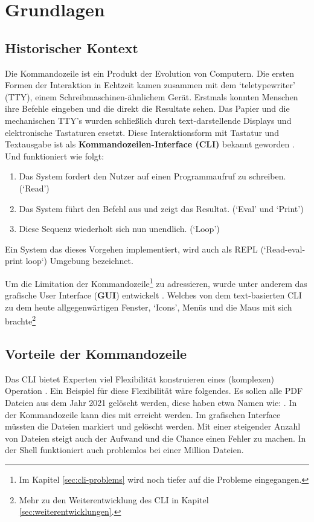 \documentclass[oneside,bibliography=totocnumbered,BCOR=5mm]{scrbook}
\begin{document}
\chapter{Grundlagen}
\label{sec:grundlagen}

\section{Historischer Kontext}
\label{sec:historic-context}

Die Kommandozeile ist ein Produkt der Evolution von Computern. Die ersten
Formen der Interaktion in Echtzeit kamen zusammen mit dem `teletypewriter'
(TTY), einem Schreibmaschinen-ähnlichem Gerät. Erstmals konnten Menschen
ihre Befehle eingeben und die direkt die Resultate sehen. Das Papier und die
mechanischen TTY's wurden schließlich durch text-darstellende Displays und
elektronische Tastaturen ersetzt. Diese Interaktionsform mit Tastatur und
Textausgabe ist als \textbf{Kommandozeilen-Interface (CLI)} bekannt geworden
\parencite[35f]{nagarajan2018}. Und funktioniert wie folgt:

\begin{enumerate}
  \item Das System fordert den Nutzer auf einen Programmaufruf zu schreiben. (`Read')
  \item Das System führt den Befehl aus und zeigt das Resultat. (`Eval' und `Print')
  \item Diese Sequenz wiederholt sich nun unendlich. (`Loop')
\end{enumerate}

Ein System das dieses Vorgehen implementiert, wird auch als REPL
(`Read-eval-print loop`) Umgebung bezeichnet.

Um die Limitation der Kommandozeile\footnote{Im Kapitel \ref{sec:cli-problems}
wird noch tiefer auf die Probleme eingegangen.} zu adressieren, wurde
unter anderem das grafische User Interface (\textbf{GUI}) entwickelt
\parencite{nielson1993}. Welches von dem text-basierten CLI zu dem
heute allgegenwärtigen Fenster, `Icons', Menüs und die Maus mit sich
brachte\footnote{Mehr zu den Weiterentwicklung des CLI in Kapitel
\ref{sec:weiterentwicklungen}.}

\section{Vorteile der Kommandozeile}

Das CLI bietet Experten viel Flexibilität konstruieren eines (komplexen)
Operation \parencite{Norman_1983}. Ein Beispiel für diese Flexibilität wäre
folgendes. Es sollen alle PDF Dateien aus dem Jahr 2021 gelöscht werden, diese
haben etwa Namen wie: . In der Kommandozeile
kann dies mit  erreicht werden. Im grafischen Interface
müssten die Dateien markiert und gelöscht werden. Mit einer steigender Anzahl
von Dateien steigt auch der Aufwand und die Chance einen Fehler zu machen.
In der Shell funktioniert  auch problemlos bei einer Million
Dateien.
\end{document}
